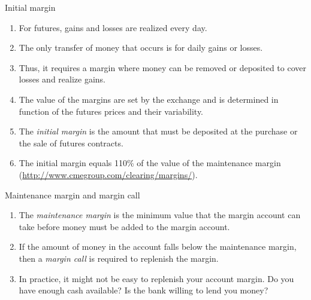 \documentclass[table,xcolor=pdftex,dvipsnames]{beamer}\usepackage[]{graphicx}\usepackage[]{color}
\begin{document}


\begin{frame}{Initial margin}
\begin{enumerate}[label=\textbullet]
      \item For futures, gains and losses are realized every day.
      \item The only transfer of money that occurs is for daily gains or losses.
      \item Thus, it requires a margin where money can be removed or deposited to cover losses and realize gains.
      \item The value of the margins are set by the exchange and is determined in function of the futures prices and their variability.
      \item The \emph{initial margin} is the amount that must be deposited at the purchase or the sale of futures contracts.
      \item The initial margin equals 110\% of the value of the maintenance margin (\url{http://www.cmegroup.com/clearing/margins/}).
\end{enumerate}
\end{frame}


\begin{frame}{Maintenance margin and margin call}
\begin{enumerate}[label=\textbullet]
      \item The \emph{maintenance margin} is the minimum value that the margin account can take before money must be added to the margin account.
      \item If the amount of money in the account falls below the maintenance margin, then a \emph{margin call} is required to replenish the margin.
      \item In practice, it might not be easy to replenish your account margin. Do you have enough cash available? Is the bank willing to lend you money?
\end{enumerate}
\end{frame}

\end{document}
